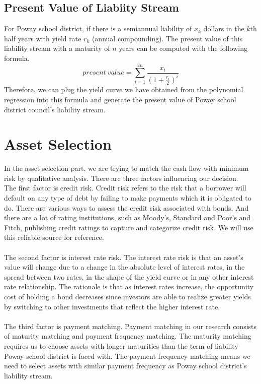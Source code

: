 \documentclass[oneside,12pt]{report}
\begin{document}
{\subsection{Present Value of Liabiity Stream}
For Poway school district, if there is a semiannual liability of $x_k$ dollars in the $k$th half years with yield rate $r_k$ (annual compounding). The present value of this liability stream with a maturity of $n$ years can be computed with the following formula.
$$ present~value=\sum_{i=1}^{2n} \frac{x_i}{(1+\frac{r_i}{2})^i} $$ 
Therefore, we can plug the yield curve we have obtained from the polynomial regression into this formula and generate the present value of Poway school district council's liability stream.\\

\section{Asset Selection}
In the asset selection part, we are trying to match the cash flow with minimum risk by qualitative analysis. There are three factors influencing our decision.\\

\noindent The first factor is credit risk. Credit risk refers to the risk that a borrower will default on any type of debt by failing to make payments which it is obligated to do. There are various ways to assess the credit risk associated with bonds. And there are a lot of rating institutions, such as Moody's, Standard and Poor's and Fitch, publishing credit ratings to capture and categorize credit risk. We will use this reliable source for reference.
\\
\\
The second factor is interest rate risk. The interest rate risk is that an asset's value will change due to a change in the absolute level of interest rates, in the spread between two rates, in the shape of the yield curve or in any other interest rate relationship. The rationale is that as interest rates increase, the opportunity cost of holding a bond decreases since investors are able to realize greater yields by switching to other investments that reflect the higher interest rate.\\
\\
The third factor is payment matching. Payment matching in our research consists of maturity matching and payment frequency matching. The maturity matching requires us to choose assets with longer maturities than the term of liability Poway school district is faced with. The payment frequency matching means we need to select assets with similar payment frequency as Poway school district's liability stream.\\

}
\end{document}
